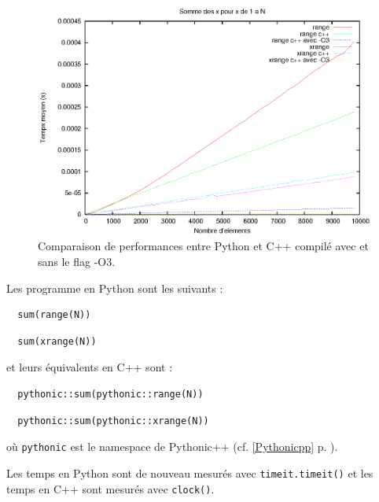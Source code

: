 \documentclass[a4paper]{article}
\begin{document}
\begin{figure}[h]
  \includegraphics[width=\textwidth]{./Pictures/RangeXrangePyCpp}
  \caption{Comparaison de performances entre Python et C++ compilé avec et sans le flag -O3.}
  \label{RangeXrangePyCpp}
\end{figure}

Les programme en Python sont les suivants :

\begin{lstlisting}
  sum(range(N))
\end{lstlisting}

\begin{lstlisting}
  sum(xrange(N))
\end{lstlisting}

et leurs équivalents en C++ sont :

\begin{lstlisting}
  pythonic::sum(pythonic::range(N))
\end{lstlisting}

\begin{lstlisting}
  pythonic::sum(pythonic::xrange(N))
\end{lstlisting}

où \texttt{pythonic} est le namespace de Pythonic++ (cf. \ref{Pythonicpp}
p. \pageref{Pythonicpp}).

Les temps en Python sont de nouveau mesurés avec \texttt{timeit.timeit()} et
les temps en C++ sont mesurés avec \texttt{clock()}.
\end{document}
